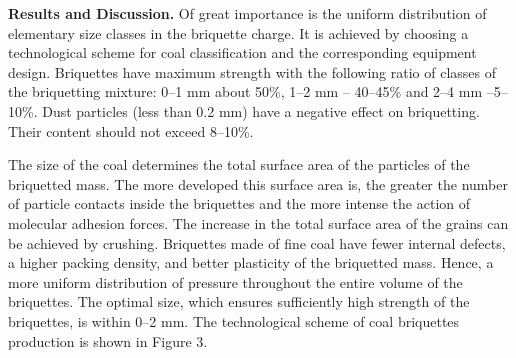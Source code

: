
{\bfseries Results and Discussion.} Of great importance is the uniform
distribution of elementary size classes in the briquette charge. It is
achieved by choosing a technological scheme for coal classification and
the corresponding equipment design. Briquettes have maximum strength
with the following ratio of classes of the briquetting mixture: 0--1 mm
about 50\%, 1--2 mm -- 40--45\% and 2--4 mm --5--10\%. Dust particles
(less than 0.2 mm) have a negative effect on briquetting. Their content
should not exceed 8--10\%.

The size of the coal determines the total surface area of
\hspace{0pt}\hspace{0pt}the particles of the briquetted mass. The more
developed this surface area is, the greater the number of particle
contacts inside the briquettes and the more intense the action of
molecular adhesion forces. The increase in the total surface area of
\hspace{0pt}\hspace{0pt}the grains can be achieved by crushing.
Briquettes made of fine coal have fewer internal defects, a higher
packing density, and better plasticity of the briquetted mass. Hence, a
more uniform distribution of pressure throughout the entire volume of
the briquettes. The optimal size, which ensures sufficiently high
strength of the briquettes, is within 0--2 mm. The technological scheme
of coal briquettes production is shown in Figure 3.

